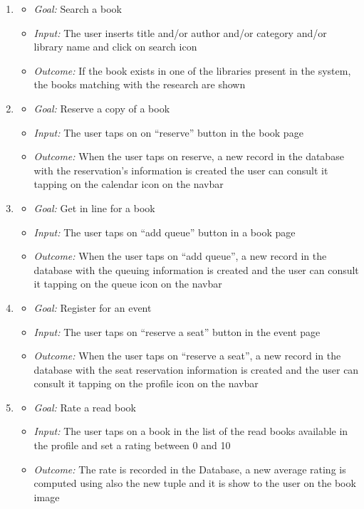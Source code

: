 \begin{enumerate}
\item 
\begin{itemize}
	\item \emph{Goal: }Search a book
	\item \emph{Input: }The user inserts title and/or author and/or category and/or library name and click on search icon
	\item \emph{Outcome: }If the book exists in one of the libraries present in the system, the books matching with the research are shown
\end{itemize}

\item 
\begin{itemize}
	\item \emph{Goal: }Reserve a copy of a book
	\item \emph{Input: }The user taps on on “reserve” button in the book page
	\item \emph{Outcome: }When the user taps on reserve, a new record in the database with the reservation’s information is created the user can consult it tapping on the calendar icon on the navbar
	
\end{itemize}

\item 
\begin{itemize}
	\item \emph{Goal: }Get in line for a book
	\item \emph{Input: }The user taps on “add queue” button in a book page
	\item \emph{Outcome: }When the user taps on “add queue”, a new record in the database with the queuing information is created and the user can consult it tapping on the queue icon on the navbar
\end{itemize}

\item 
\begin{itemize}
	\item \emph{Goal: }Register for an event
	\item \emph{Input: }The user taps on “reserve a seat” button in the event page
	\item \emph{Outcome: }When the user taps on “reserve a seat”, a new record in the database with the seat reservation information is created and the user can consult it tapping on the profile icon on the navbar
\end{itemize}

\item 
\begin{itemize}
	\item \emph{Goal: }Rate a read book
	\item \emph{Input: }The user taps on a book in the list of the read books available in the profile and set a rating between 0 and 10
	\item \emph{Outcome: }The rate is recorded in the Database, a new average rating is computed using also the new tuple and it is show to the user on the book image
\end{itemize}



\end{enumerate}
